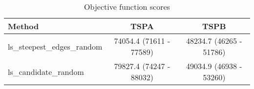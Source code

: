 \begin{table}[!htbp]
\centering
\caption{Objective function scores}
\begin{tabular}{lcc}
\hline
 Method & TSPA & TSPB \\
\hline
ls\_steepest\_edges\_random & 74054.4 (71611 - 77589) & 48234.7 (46265 - 51786) \\
ls\_candidate\_random & 79827.4 (74247 - 88032) & 49034.9 (46938 - 53260) \\
\hline
\end{tabular}
\end{table}